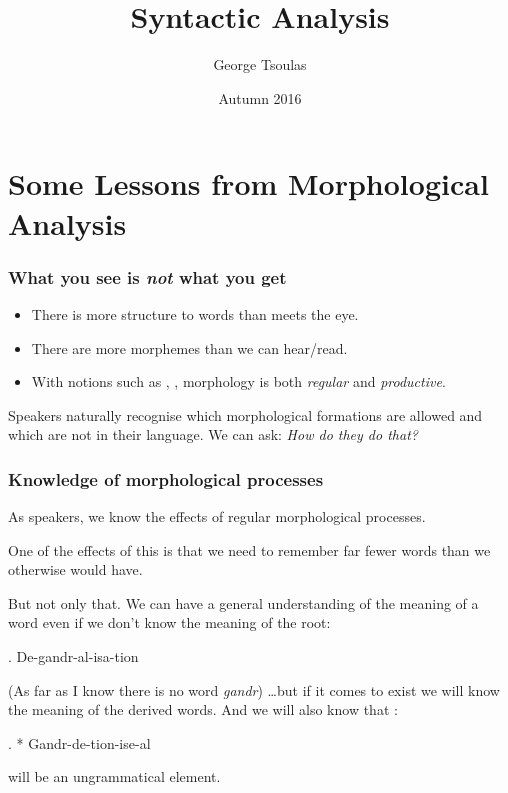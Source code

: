 


\title{Syntactic Analysis}
\date{Autumn 2016}
\author{George Tsoulas}



\maketitle

\section{Some Lessons from Morphological Analysis}

\begin{frame}
  \frametitle{What you see is \textit{not} what you get}

  \begin{itemize}
  \item There is more structure to words than meets the eye. \pause
  \item There are more morphemes than we can hear/read. \pause
  \item With notions such as , ,  morphology is both \textit{regular} and \textit{productive}.
  \end{itemize}

Speakers naturally recognise which morphological formations are allowed and which are not in their language.  We can ask: \textit{How do they do that?}
\end{frame}



\begin{frame}
\frametitle{Knowledge of morphological processes}

As speakers, we know the effects of regular morphological processes.  

One of the effects of this is that we need to remember far fewer words than we otherwise would have.

\end{frame}

\begin{frame}
  But not only that.  We can have a general understanding of the meaning of a word even if we don't know the meaning of the root:

\ex. De-gandr-al-isa-tion

(As far as I know there is no word \textit{gandr}) \ldots but if it comes to exist we will know the meaning of the derived words.  And we will also know that :

\ex. * Gandr-de-tion-ise-al

will be an ungrammatical element.
\end{frame}

